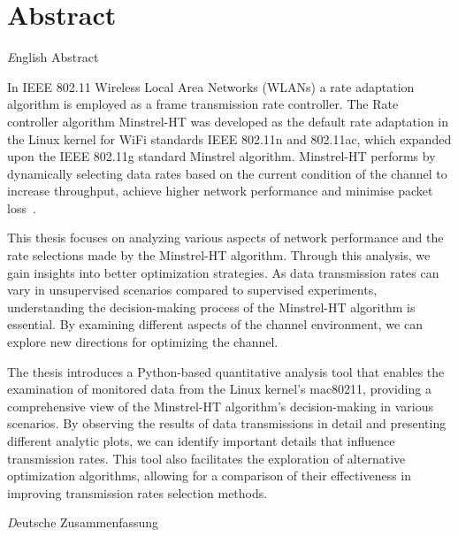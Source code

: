 \chapter*{Abstract}
\label{chap:abstract}

%
\textit English Abstract 




In IEEE 802.11 Wireless Local Area Networks (WLANs) a rate adaptation algorithm is employed as a frame transmission rate controller. The Rate controller algorithm Minstrel-HT was developed as the default rate adaptation in the Linux kernel for WiFi standards IEEE 802.11n and 802.11ac, which expanded upon the IEEE 802.11g standard Minstrel algorithm.
Minstrel-HT performs by dynamically selecting data rates based on the current condition of the channel to increase throughput, achieve higher network performance and minimise packet loss~\cite{arif2017evaluation}.

This thesis focuses on analyzing various aspects of network performance and the rate selections made by the Minstrel-HT algorithm. Through this analysis, we gain insights into better optimization strategies. As data transmission rates can vary in unsupervised scenarios compared to supervised experiments, understanding the decision-making process of the Minstrel-HT algorithm is essential. By examining different aspects of the channel environment, we can explore new directions for optimizing the channel.

The thesis introduces a Python-based quantitative analysis tool that enables the examination of monitored data from the Linux kernel's mac80211, providing a comprehensive view of the Minstrel-HT algorithm's decision-making in various scenarios. By observing the results of data transmissions in detail and presenting different analytic plots, we can identify important details that influence transmission rates. This tool also facilitates the exploration of alternative optimization algorithms, allowing for a comparison of their effectiveness in improving transmission rates selection methods.
\newpage

\textit Deutsche Zusammenfassung 


